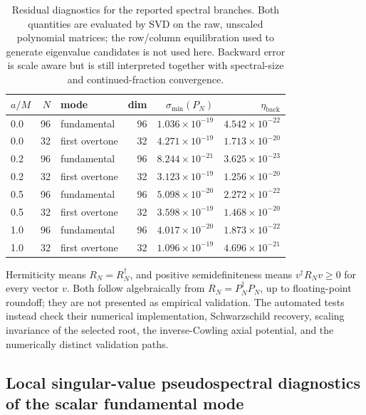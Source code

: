 \documentclass[12pt,a4paper]{article}
\begin{document}
\begin{table}[H]
\centering
\footnotesize
\renewcommand{\arraystretch}{1.14}
\color{blue}
\begin{tabular}{lrlrrr}
\toprule
\(a/M\) & \(N\) & mode & dim & \(\sigma_{\min}(P_N)\) & \(\eta_{\mathrm{back}}\)\\
\midrule
0.0 & 96 & fundamental & 96 & \(1.036\times10^{-19}\) & \(4.542\times10^{-22}\)\\
0.0 & 32 & first overtone & 32 & \(4.271\times10^{-19}\) & \(1.713\times10^{-20}\)\\
0.2 & 96 & fundamental & 96 & \(8.244\times10^{-21}\) & \(3.625\times10^{-23}\)\\
0.2 & 32 & first overtone & 32 & \(3.123\times10^{-19}\) & \(1.256\times10^{-20}\)\\
0.5 & 96 & fundamental & 96 & \(5.098\times10^{-20}\) & \(2.272\times10^{-22}\)\\
0.5 & 32 & first overtone & 32 & \(3.598\times10^{-19}\) & \(1.468\times10^{-20}\)\\
1.0 & 96 & fundamental & 96 & \(4.017\times10^{-20}\) & \(1.873\times10^{-22}\)\\
1.0 & 32 & first overtone & 32 & \(1.096\times10^{-19}\) & \(4.696\times10^{-21}\)\\
\bottomrule
\end{tabular}
\caption{Residual diagnostics for the reported spectral branches.  Both
quantities are evaluated by SVD on the raw, unscaled polynomial matrices; the
row/column equilibration used to generate eigenvalue candidates is not used
here.  Backward error is scale aware but is still interpreted together with
spectral-size and continued-fraction convergence.}
\color{black}
\label{tab:residualdiagnostics}
\end{table}

\color{blue}
Hermiticity means \(R_N=R_N^\dagger\), and positive semidefiniteness means
\(v^\dagger R_Nv\geq0\) for every vector \(v\).  Both follow algebraically from
\(R_N=P_N^\dagger P_N\), up to floating-point roundoff; they are not presented
as empirical validation.  The automated tests instead check their numerical
implementation, Schwarzschild recovery, scaling invariance of the selected
root, the inverse-Cowling axial potential, and the numerically distinct validation paths.
\color{black}

\subsection{Local singular-value pseudospectral diagnostics of the scalar fundamental mode}
\end{document}
